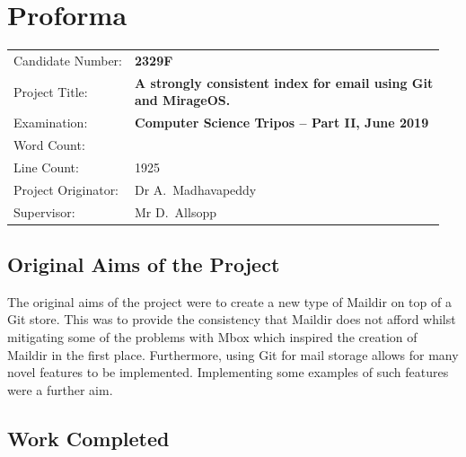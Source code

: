 \documentclass[12pt,a4paper,twoside,openright]{report}
\begin{document}
\bigskip
{}

\medskip
{}

\chapter*{Proforma}

\begin{adjustbox}{width={\textwidth},totalheight={\textheight},keepaspectratio}%
{\large
\begin{tabular}{ll}
Candidate Number:   & \bf 2329F \\
Project Title:      & \makecell[l]{\bf A strongly consistent index for email using Git \\ \bf and MirageOS.} \\
Examination:        & \bf Computer Science Tripos -- Part II, June 2019 \\
Word Count:         & \bf \unskip\footnotemark[1] \\
Line Count:         & 1925\footnotemark[2] \\
Project Originator: & Dr A.~Madhavapeddy \\
Supervisor:         & Mr D.~Allsopp \\
\end{tabular}
}
\end{adjustbox}



\section*{Original Aims of the Project}

The original aims of the project were to create a new type of Maildir on top of a Git store. This was to provide the consistency that Maildir does not afford whilst mitigating some of the problems with Mbox which inspired the creation of Maildir in the first place. Furthermore, using Git for mail storage allows for many novel features to be implemented. Implementing some examples of such features were a further aim.

\section*{Work Completed}
\end{document}
